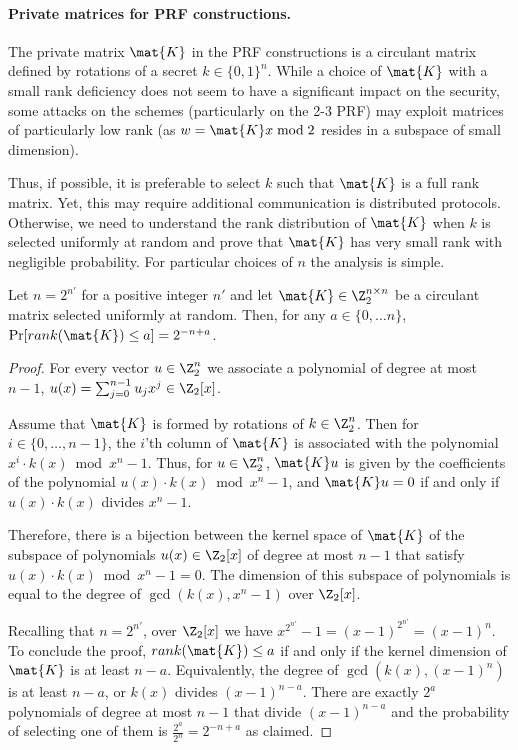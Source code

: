 \paragraph{Private matrices for PRF constructions.}
The private matrix $\mat{K}$ in the PRF constructions is a circulant matrix
defined by rotations of a secret $k \in \{0,1\}^n$.
While a choice of $\mat{K}$ with a small rank deficiency does not seem to
have a significant impact on the security,
some attacks on the schemes (particularly on the 2-3 PRF) may exploit
matrices of particularly low rank
(as $w = \mat{K}x \bmod 2$ resides in a subspace of small dimension).

Thus, if possible, it is preferable to select $k$ such that $\mat{K}$
is a full rank matrix. Yet, this may require additional communication
is distributed protocols.
Otherwise, we need to understand the rank distribution of $\mat{K}$
when $k$ is selected uniformly at random and prove that $\mat{K}$
has very small rank with negligible probability.
For particular choices of $n$ the analysis is simple.
\begin{proposition}
\label{prop:rank}
Let $n = 2^{n'}$ for a positive integer $n'$
and let $\mat{K} \in \Z_2^{n \times n}$
be a circulant matrix selected uniformly at random.
Then, for any $a \in \{0,\ldots n\}$,
$\Pr[rank(\mat{K}) \leq a] = 2^{-n+a}$.
\end{proposition}

\begin{proof}
For every vector $u \in \Z_2^{n}$
we associate a polynomial of degree at most $n-1$,
$u(x) = \sum_{j=0}^{n-1} u_j x^{j} \in \Z_2[x]$.

Assume that $\mat{K}$ is formed by rotations
of $k \in \Z_2^{n}$.
Then for $i \in \{0,\ldots, n-1\}$,
the $i$'th column of $\mat{K}$ is associated with the polynomial
$x^i \cdot k(x) \bmod x^n - 1$.
Thus, for $u \in \Z_2^{n}$, $\mat{K}u$ is given
by the coefficients of the polynomial
$u(x) \cdot k(x) \bmod x^n - 1$,
and $\mat{K}u = 0$ if and only if
$u(x) \cdot k(x)$ divides $x^n - 1$.

Therefore, there is a bijection between the kernel space of $\mat{K}$
of the subspace of polynomials $u(x) \in \Z_2[x]$
of degree at most $n-1$
that satisfy $u(x) \cdot k(x) \bmod x^n - 1 = 0$.
The dimension of this subspace of polynomials is equal to
the degree of $\gcd(k(x), x^n - 1)$ over $\Z_2[x]$.

Recalling that $n = 2^{n'}$, over $\Z_2[x]$ we have
$x^{2^{n'}} - 1 = (x - 1)^{2^{n'}} = (x - 1)^n$.
To conclude the proof,
$rank(\mat{K}) \leq a$ if and only if
the kernel dimension of $\mat{K}$ is at least $n-a$.
Equivalently, the degree of $\gcd(k(x), (x - 1)^n)$
is at least $n-a$, or
$k(x)$ divides $(x - 1)^{n-a}$.
There are exactly $2^a$ polynomials of degree at most
$n-1$ that divide $(x - 1)^{n-a}$
and the probability of selecting one of them is
$\tfrac{2^{a}}{2^n} = 2^{-n+a}$ as claimed.
\end{proof}



